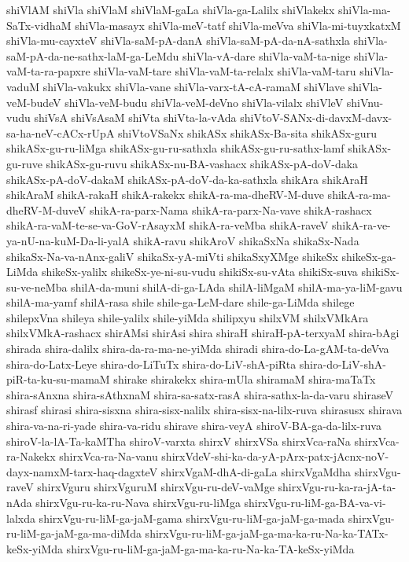 {shiVlAM
shiVla
shiVlaM
shiVlaM-gaLa
shiVla-ga-Lalilx
shiVlakekx
shiVla-ma-SaTx-vidhaM
shiVla-masayx
shiVla-meV-tatf
shiVla-meVva
shiVla-mi-tuyxkatxM
shiVla-mu-cayxteV
shiVla-saM-pA-danA
shiVla-saM-pA-da-nA-sathxla
shiVla-saM-pA-da-ne-sathx-laM-ga-LeMdu
shiVla-vA-dare
shiVla-vaM-ta-nige
shiVla-vaM-ta-ra-papxre
shiVla-vaM-tare
shiVla-vaM-ta-relalx
shiVla-vaM-taru
shiVla-vaduM
shiVla-vakukx
shiVla-vane
shiVla-varx-tA-cA-ramaM
shiVlave
shiVla-veM-budeV
shiVla-veM-budu
shiVla-veM-deVno
shiVla-vilalx
shiVleV
shiVnu-vudu
shiVsA
shiVsAsaM
shiVta
shiVta-la-vAda
shiVtoV-SANx-di-davxM-davx-sa-ha-neV-cACx-rUpA
shiVtoVSaNx
shikASx
shikASx-Ba-sita
shikASx-guru
shikASx-gu-ru-liMga
shikASx-gu-ru-sathxla
shikASx-gu-ru-sathx-lamf
shikASx-gu-ruve
shikASx-gu-ruvu
shikASx-nu-BA-vashacx
shikASx-pA-doV-daka
shikASx-pA-doV-dakaM
shikASx-pA-doV-da-ka-sathxla
shikAra
shikAraH
shikAraM
shikA-rakaH
shikA-rakekx
shikA-ra-ma-dheRV-M-duve
shikA-ra-ma-dheRV-M-duveV
shikA-ra-parx-Nama
shikA-ra-parx-Na-vave
shikA-rashacx
shikA-ra-vaM-te-se-va-GoV-rAsayxM
shikA-ra-veMba
shikA-raveV
shikA-ra-ve-ya-nU-na-kuM-Da-li-yalA
shikA-ravu
shikAroV
shikaSxNa
shikaSx-Nada
shikaSx-Na-va-nAnx-galiV
shikaSx-yA-miVti
shikaSxyXMge
shikeSx
shikeSx-ga-LiMda
shikeSx-yalilx
shikeSx-ye-ni-su-vudu
shikiSx-su-vAta
shikiSx-suva
shikiSx-su-ve-neMba
shilA-da-muni
shilA-di-ga-LAda
shilA-liMgaM
shilA-ma-ya-liM-gavu
shilA-ma-yamf
shilA-rasa
shile
shile-ga-LeM-dare
shile-ga-LiMda
shilege
shilepxVna
shileya
shile-yalilx
shile-yiMda
shilipxyu
shilxVM
shilxVMkAra
shilxVMkA-rashacx
shirAMsi
shirAsi
shira
shiraH
shiraH-pA-terxyaM
shira-bAgi
shirada
shira-dalilx
shira-da-ra-ma-ne-yiMda
shiradi
shira-do-La-gAM-ta-deVva
shira-do-Latx-Leye
shira-do-LiTuTx
shira-do-LiV-shA-piRta
shira-do-LiV-shA-piR-ta-ku-su-mamaM
shirake
shirakekx
shira-mUla
shiramaM
shira-maTaTx
shira-sAnxna
shira-sAthxnaM
shira-sa-satx-rasA
shira-sathx-la-da-varu
shiraseV
shirasf
shirasi
shira-sisxna
shira-sisx-nalilx
shira-sisx-na-lilx-ruva
shirasusx
shirava
shira-va-na-ri-yade
shira-va-ridu
shirave
shira-veyA
shiroV-BA-ga-da-lilx-ruva
shiroV-la-lA-Ta-kaMTha
shiroV-varxta
shirxV
shirxVSa
shirxVca-raNa
shirxVca-ra-Nakekx
shirxVca-ra-Na-vanu
shirxVdeV-shi-ka-da-yA-pArx-patx-jAcnx-noV-dayx-namxM-tarx-haq-dagxteV
shirxVgaM-dhA-di-gaLa
shirxVgaMdha
shirxVgu-raveV
shirxVguru
shirxVguruM
shirxVgu-ru-deV-vaMge
shirxVgu-ru-ka-ra-jA-ta-nAda
shirxVgu-ru-ka-ru-Nava
shirxVgu-ru-liMga
shirxVgu-ru-liM-ga-BA-va-vi-lalxda
shirxVgu-ru-liM-ga-jaM-gama
shirxVgu-ru-liM-ga-jaM-ga-mada
shirxVgu-ru-liM-ga-jaM-ga-ma-diMda
shirxVgu-ru-liM-ga-jaM-ga-ma-ka-ru-Na-ka-TATx-keSx-yiMda
shirxVgu-ru-liM-ga-jaM-ga-ma-ka-ru-Na-ka-TA-keSx-yiMda
}
